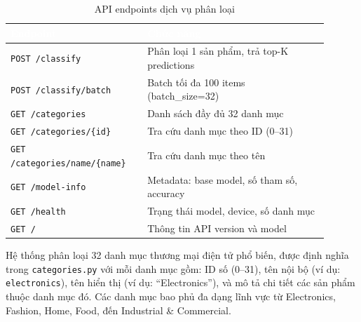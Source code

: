 {\begin{table}[htbp]
\centering
\caption{API endpoints dịch vụ phân loại}
\label{tab:classify-api}
\begin{tabular}{>{\raggedright\arraybackslash}p{0.38\linewidth} >{\raggedright\arraybackslash}p{0.52\linewidth}}
\toprule
\rowcolor{headerblue} \textcolor{white}{\textbf{Endpoint}} & \textcolor{white}{\textbf{Chức năng}} \\
\midrule
\rowcolor{rowgray} \texttt{POST /classify} & Phân loại 1 sản phẩm, trả top-K predictions \\
\texttt{POST /classify/batch} & Batch tối đa 100 items (batch\_size=32) \\
\rowcolor{rowgray} \texttt{GET /categories} & Danh sách đầy đủ 32 danh mục \\
\texttt{GET /categories/\{id\}} & Tra cứu danh mục theo ID (0--31) \\
\rowcolor{rowgray} \texttt{GET /categories/name/\{name\}} & Tra cứu danh mục theo tên \\
\texttt{GET /model-info} & Metadata: base model, số tham số, accuracy \\
\rowcolor{rowgray} \texttt{GET /health} & Trạng thái model, device, số danh mục \\
\texttt{GET /} & Thông tin API version và model \\
\bottomrule
\end{tabular}
\end{table}

Hệ thống phân loại 32 danh mục thương mại điện tử phổ biến, được định nghĩa
trong \texttt{categories.py} với mỗi danh mục gồm: ID số (0--31), tên nội bộ
(ví dụ: \texttt{electronics}), tên hiển thị (ví dụ: ``Electronics''), và mô tả
chi tiết các sản phẩm thuộc danh mục đó. Các danh mục bao phủ đa dạng lĩnh
vực từ Electronics, Fashion, Home, Food, đến Industrial \& Commercial.

}%


